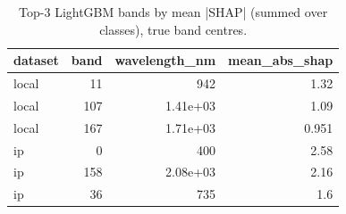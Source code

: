 \begin{table}
\caption{Top-3 LightGBM bands by mean |SHAP| (summed over classes), true band centres.}
\label{tab:shap_top_bands}
\begin{tabular}{lrrr}
\toprule
dataset & band & wavelength\_nm & mean\_abs\_shap \\
\midrule
local & 11 & 942 & 1.32 \\
local & 107 & 1.41e+03 & 1.09 \\
local & 167 & 1.71e+03 & 0.951 \\
ip & 0 & 400 & 2.58 \\
ip & 158 & 2.08e+03 & 2.16 \\
ip & 36 & 735 & 1.6 \\
\bottomrule
\end{tabular}
\end{table}
